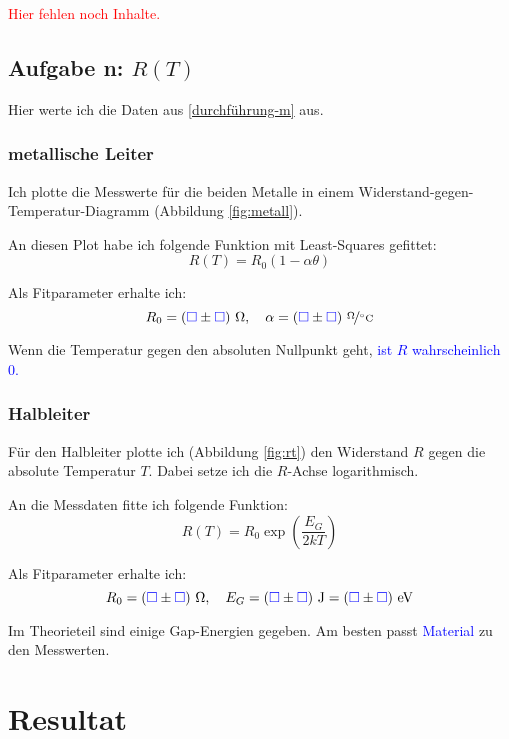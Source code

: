 \documentclass[11pt, ngerman]{article}
\newcommand{\messwert}{\textcolor{blue}{\square}}
\newcommand{\emesswert}{\left(\messwert \pm \messwert \right)}
\newcommand{\fehlt}{\textcolor{red}{Hier fehlen noch Inhalte.}}
\begin{document}
\fehlt

\subsection{Aufgabe n: $R(T)$}

\label{auswertung-n}

Hier werte ich die Daten aus \ref{durchführung-m} aus.

\subsubsection{metallische Leiter}

Ich plotte die Messwerte für die beiden Metalle in einem
Widerstand-gegen-Temperatur-Diagramm (Abbildung \ref{fig:metall}).

An diesen Plot habe ich folgende Funktion mit Least-Squares gefittet:
\[ R(T) = R_0 \left( 1 - \alpha \theta \right) \]

Als Fitparameter erhalte ich:
\[
	R_0 = \unit[\emesswert] \Omega,
	\quad
	\alpha = \unitfrac[\emesswert]\Omega{^\circ C}
\]

Wenn die Temperatur gegen den absoluten Nullpunkt geht, \textcolor{blue}{ist $R$ wahrscheinlich 0.}

\subsubsection{Halbleiter}

Für den Halbleiter plotte ich (Abbildung \ref{fig:rt}) den Widerstand $R$ gegen
die absolute Temperatur $T$. Dabei setze ich die $R$-Achse logarithmisch.

An die Messdaten fitte ich folgende Funktion:
\[ R(T) = R_0 \exp \left( \frac{E_G}{2 k T} \right) \]

Als Fitparameter erhalte ich:
\[
	R_0 = \unit[\emesswert] \Omega,
	\quad
	E_G = \unit[\emesswert] J = \unit[\emesswert]{eV}
\]

Im Theorieteil sind einige Gap-Energien gegeben. Am besten passt \textcolor{blue}{Material} zu den Messwerten.


\section{Resultat}
\end{document}
